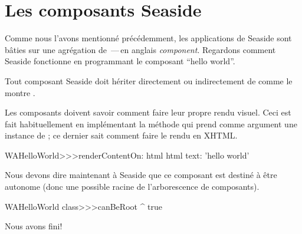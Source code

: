 \documentclass[a4paper,10pt,twoside]{book}
\begin{document}
\section{Les composants Seaside}


Comme nous l'avons mentionné précédemment, les applications de
Seaside sont bâties sur une agrégation de
  \,---\,en anglais \emph{component}.
Regardons comment Seaside fonctionne en programmant le composant
``hello world''.

Tout composant Seaside doit hériter directement ou indirectement de
 comme le montre .


Les composants doivent savoir comment faire leur propre rendu
  visuel.
Ceci est fait habituellement en implémentant la méthode
 qui prend comme argument une
instance de  ; ce dernier sait comment faire le
rendu en XHTML.

\begin{code}{}
WAHelloWorld>>>renderContentOn: html
	html text: 'hello world'
\end{code}

\noindent
Nous devons dire maintenant à Seaside que ce composant est destiné à
être autonome
(donc une possible racine de l'arborescence de composants). %


\begin{code}{}
WAHelloWorld class>>>canBeRoot
	^ true
\end{code}

\noindent
Nous avons fini!
\end{document}
